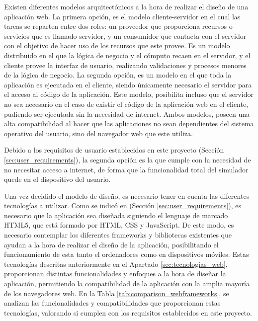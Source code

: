 Existen diferentes modelos arquitectónicos a la hora de realizar el diseño de una aplicación web. La primera opción, es el modelo cliente-servidor en el cual las tareas se reparten entre dos roles: un proveedor que proporciona recursos o servicios que es llamado servidor, y un consumidor que contacta con el servidor con el objetivo de hacer uso de los recursos que este provee. Es un modelo distribuido en el que la lógica de negocio y el cómputo recaen en el servidor, y el cliente provee la interfaz de usuario, realizando validaciones y procesos menores de la lógica de negocio. La segunda opción, es un modelo en el que toda la aplicación es ejecutada en el cliente, siendo únicamente necesario el servidor para el acceso al código de la aplicación. Este modelo, posibilita incluso que el servidor no sea necesario en el caso de existir el código de la aplicación web en el cliente, pudiendo ser ejecutada sin la necesidad de internet. Ambos modelos, poseen una alta compatibilidad al hacer que las aplicaciones no sean dependientes del sistema operativo del usuario, sino del navegador web que este utiliza.

Debido a los requisitos de usuario establecidos en este proyecto (Sección \ref{sec:user_requirements}), la segunda opción es la que cumple con la necesidad de no necesitar acceso a internet, de forma que la funcionalidad total del simulador quede en el dispositivo del usuario.

Una vez decidido el modelo de diseño, es necesario tener en cuenta las diferentes tecnologías a utilizar. Como se indicó en (Sección \ref{sec:user_requirements}), es necesario que la aplicación sea diseñada siguiendo el lenguaje de marcado HTML5, que está formado por HTML, CSS y JavaScript. De este modo, es necesario contemplar los diferentes frameworks y bibliotecas existentes que ayudan a la hora de realizar el diseño de la aplicación, posibilitando el funcionamiento de esta tanto el ordenadores como en dispositivos móviles. Estas tecnologías descritas anteriormente en el Apartado \ref{sec:tecnologias_web}, proporcionan distintas funcionalidades y enfoques a la hora de diseñar la aplicación, permitiendo la compatibilidad de la aplicación con la amplia mayoría de los navegadores web. En la Tabla \ref{tab:comparison_webframeworks}, se analizan las funcionalidades y compatibilidades que proporcionan estas tecnologías, valorando si cumplen con los requisitos establecidos en este proyecto.

